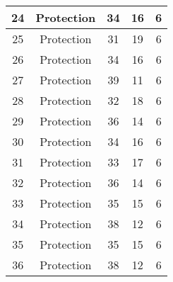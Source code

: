 \documentclass[results.tex]{subfiles}
\begin{document}
\begin{center}
\begin{tabular}{| c || c | c | c | c |}
            \hline
            24                      & Protection                   & 34                     & 16                      & 6                    \\
            \hline
            25                      & Protection                   & 31                     & 19                      & 6                    \\
            \hline
            26                      & Protection                   & 34                     & 16                      & 6                    \\
            \hline
            27                      & Protection                   & 39                     & 11                      & 6                    \\
            \hline
            28                      & Protection                   & 32                     & 18                      & 6                    \\
            \hline
            29                      & Protection                   & 36                     & 14                      & 6                    \\
            \hline
            30                      & Protection                   & 34                     & 16                      & 6                    \\
            \hline
            31                      & Protection                   & 33                     & 17                      & 6                    \\
            \hline
            32                      & Protection                   & 36                     & 14                      & 6                    \\
            \hline
            33                      & Protection                   & 35                     & 15                      & 6                    \\
            \hline
            34                      & Protection                   & 38                     & 12                      & 6                    \\
            \hline
            35                      & Protection                   & 35                     & 15                      & 6                    \\
            \hline
            36                      & Protection                   & 38                     & 12                      & 6                    \\

\end{tabular}
\end{center}
\end{document}
